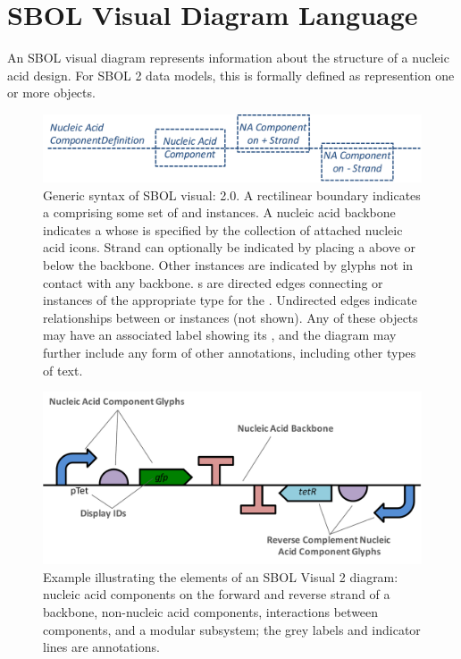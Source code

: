 \section{SBOL Visual Diagram Language}
\label{sec:language}

An SBOL visual diagram represents information about the structure of a nucleic acid design.
For SBOL 2 data models, this is formally defined as represention one or more  objects.

\begin{figure}[h!]
\centering
\includegraphics[width=6in]{figures/SBOLsyntax.pdf}
\caption{Generic syntax of SBOL visual:  2.0. A rectilinear boundary indicates a  comprising some set of  and  instances.
A nucleic acid backbone indicates a  whose  is specified by the collection of attached nucleic acid  icons.  
Strand can optionally be indicated by placing a  above or below the backbone.  
Other  instances are indicated by glyphs not in contact with any backbone.
s are directed edges connecting  or  instances of the appropriate type for the .  Undirected edges indicate  relationships between  or  instances (not shown).
Any of these objects may have an associated label showing its , and the diagram may further include any form of other annotations, including other types of text.}
\label{f:syntax}
\end{figure}

\begin{figure}[h!]
\centering
\includegraphics[width=6in]{figures/SBOLgeneral.pdf}
\caption{Example illustrating the elements of an SBOL Visual 2 diagram: nucleic acid components on the forward and reverse strand of a backbone, non-nucleic acid components,  interactions between components, and a modular subsystem; the grey labels and indicator lines are annotations.}
\label{f:example}
\end{figure}

